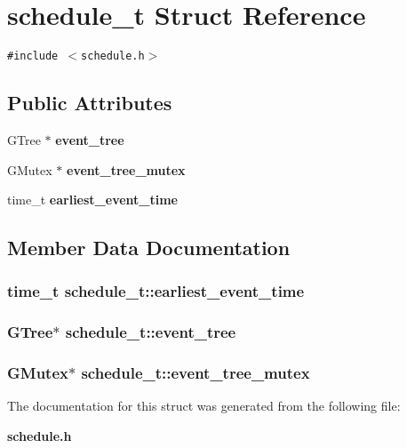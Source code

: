 \section{schedule\_\-t Struct Reference}
\label{structschedule__t}
{\tt \#include $<$schedule.h$>$}

\subsection*{Public Attributes}
\begin{CompactItemize}
\item 
GTree $\ast$ {\bf event\_\-tree}
\item 
GMutex $\ast$ {\bf event\_\-tree\_\-mutex}
\item 
time\_\-t {\bf earliest\_\-event\_\-time}
\end{CompactItemize}


\subsection{Member Data Documentation}
\subsubsection{\setlength{\rightskip}{0pt plus 5cm}time\_\-t {\bf schedule\_\-t::earliest\_\-event\_\-time}}\label{structschedule__t_o2}


\subsubsection{\setlength{\rightskip}{0pt plus 5cm}GTree$\ast$ {\bf schedule\_\-t::event\_\-tree}}\label{structschedule__t_o0}


\subsubsection{\setlength{\rightskip}{0pt plus 5cm}GMutex$\ast$ {\bf schedule\_\-t::event\_\-tree\_\-mutex}}\label{structschedule__t_o1}




The documentation for this struct was generated from the following file:\begin{CompactItemize}
\item 
{\bf schedule.h}\end{CompactItemize}
